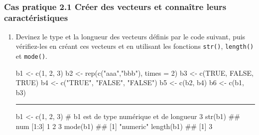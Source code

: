 \documentclass[12pt,twosided, notitlepage]{book}
\newenvironment{Shaded}{}{}
\newcommand{\KeywordTok}[1]{\textcolor[rgb]{0.00,0.00,1.00}{#1}}
\newcommand{\DataTypeTok}[1]{#1}
\newcommand{\DecValTok}[1]{#1}
\newcommand{\StringTok}[1]{\textcolor[rgb]{0.00,0.50,0.50}{#1}}
\newcommand{\CommentTok}[1]{\textcolor[rgb]{0.00,0.50,0.00}{#1}}
\newcommand{\OtherTok}[1]{\textcolor[rgb]{1.00,0.25,0.00}{#1}}
\newcommand{\NormalTok}[1]{#1}
\newif \ifsol
\renewenvironment{Shaded}{\begin{snugshade}}{\end{snugshade}}
\begin{document}
~

\subsubsection{\texorpdfstring{\textbf{Cas pratique 2.1} Créer des
vecteurs et connaître leurs
caractéristiques}{Cas pratique 2.1 Créer des vecteurs et connaître leurs caractéristiques}}\label{cas-pratique-2.1-creer-des-vecteurs-et-connaitre-leurs-caracteristiques}


\begin{enumerate}
\def\labelenumi{\alph{enumi}.}
\item
  Devinez le type et la longueur des vecteurs définis par le code
  suivant, puis vérifiez-les en créant ces vecteurs et en utilisant les
  fonctions \texttt{str()},
  \texttt{length()} et
  \texttt{mode()}.

\begin{Shaded}
\begin{Highlighting}[]
\NormalTok{b1 <-}\StringTok{ }\KeywordTok{c}\NormalTok{(}\DecValTok{1}\NormalTok{, }\DecValTok{2}\NormalTok{, }\DecValTok{3}\NormalTok{)}
\NormalTok{b2 <-}\StringTok{ }\KeywordTok{rep}\NormalTok{(}\KeywordTok{c}\NormalTok{(}\StringTok{"aaa"}\NormalTok{,}\StringTok{"bbb"}\NormalTok{), }\DataTypeTok{times =} \DecValTok{2}\NormalTok{)}
\NormalTok{b3 <-}\StringTok{ }\KeywordTok{c}\NormalTok{(}\OtherTok{TRUE}\NormalTok{, }\OtherTok{FALSE}\NormalTok{, }\OtherTok{TRUE}\NormalTok{)}
\NormalTok{b4 <-}\StringTok{ }\KeywordTok{c}\NormalTok{(}\StringTok{"TRUE"}\NormalTok{, }\StringTok{"FALSE"}\NormalTok{, }\StringTok{"FALSE"}\NormalTok{)}
\NormalTok{b5 <-}\StringTok{ }\KeywordTok{c}\NormalTok{(b2, b4)}
\NormalTok{b6 <-}\StringTok{ }\KeywordTok{c}\NormalTok{(b1, b3)}
\end{Highlighting}
\end{Shaded}

  \ifsol 

  \begin{center} \rule{0.5\linewidth}{\linethickness}\end{center}

\begin{Shaded}
\begin{Highlighting}[]
\NormalTok{b1 <-}\StringTok{ }\KeywordTok{c}\NormalTok{(}\DecValTok{1}\NormalTok{, }\DecValTok{2}\NormalTok{, }\DecValTok{3}\NormalTok{)}
\CommentTok{# b1 est de type numérique et de longueur 3}
\KeywordTok{str}\NormalTok{(b1)}
\NormalTok{  ##  num [1:3] 1 2 3}
\KeywordTok{mode}\NormalTok{(b1)}
\NormalTok{  ## [1] "numeric"}
\KeywordTok{length}\NormalTok{(b1)}
\NormalTok{  ## [1] 3}


\end{Highlighting}
\end{Shaded}
\end{enumerate}
\end{document}
